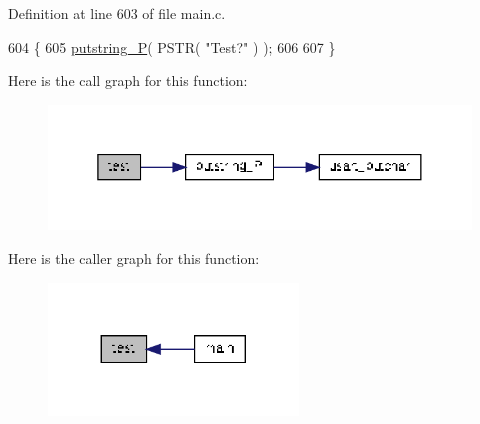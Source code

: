 Definition at line 603 of file main.\-c.


\begin{DoxyCode}
604 \{
605     \hyperlink{group__biba__utils_gaf1b54c4c5b890362b485636395859b3d}{putstring\_P}( PSTR( \textcolor{stringliteral}{"Test?"} ) );
606 
607 \}
\end{DoxyCode}


Here is the call graph for this function\-:
\nopagebreak
\begin{figure}[H]
\begin{center}
\leavevmode
\includegraphics[width=338pt]{group__biba__main_ga708a4c1a4d0c4acc4c447310dd4db27f_cgraph}
\end{center}
\end{figure}




Here is the caller graph for this function\-:
\nopagebreak
\begin{figure}[H]
\begin{center}
\leavevmode
\includegraphics[width=188pt]{group__biba__main_ga708a4c1a4d0c4acc4c447310dd4db27f_icgraph}
\end{center}
\end{figure}


